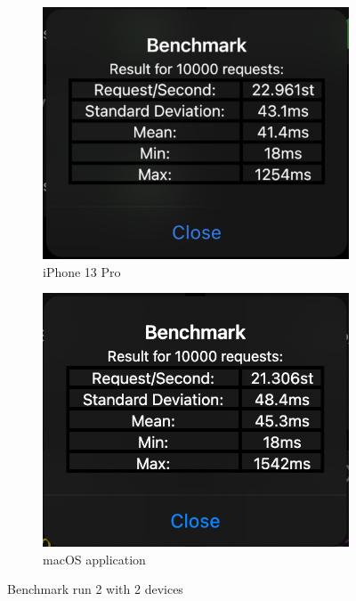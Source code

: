 \begin{figure}[H]
    \centering
    \begin{subfigure}{0.48\textwidth}
        \centering
        \includegraphics[width=1\textwidth]{img/Run2Dev1.png}
        \caption{iPhone 13 Pro}
        \label{fig:bench2:dev1}
    \end{subfigure}
    \hspace{5px}
    \begin{subfigure}{0.48\textwidth}
        \centering
        \includegraphics[width=1\textwidth]{img/Run2Dev2.png}
        \caption{macOS application}
        \label{fig:bench2:dev2}
    \end{subfigure}
    \caption{Benchmark run 2 with 2 devices}
    \label{fig:bench2}
\end{figure}

